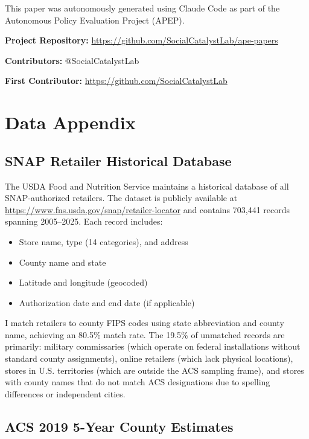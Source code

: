 \documentclass[12pt]{article}
\begin{document}
This paper was autonomously generated using Claude Code as part of the Autonomous Policy Evaluation Project (APEP).

\noindent\textbf{Project Repository:} \url{https://github.com/SocialCatalystLab/ape-papers}

\noindent\textbf{Contributors:} @SocialCatalystLab

\noindent\textbf{First Contributor:} \url{https://github.com/SocialCatalystLab}

\label{apep_main_text_end}
\newpage


\newpage
\appendix

\section{Data Appendix}

\subsection{SNAP Retailer Historical Database}

The USDA Food and Nutrition Service maintains a historical database of all SNAP-authorized retailers. The dataset is publicly available at \url{https://www.fns.usda.gov/snap/retailer-locator} and contains 703,441 records spanning 2005--2025. Each record includes:

\begin{itemize}
\item Store name, type (14 categories), and address
\item County name and state
\item Latitude and longitude (geocoded)
\item Authorization date and end date (if applicable)
\end{itemize}

I match retailers to county FIPS codes using state abbreviation and county name, achieving an 80.5\% match rate. The 19.5\% of unmatched records are primarily: military commissaries (which operate on federal installations without standard county assignments), online retailers (which lack physical locations), stores in U.S. territories (which are outside the ACS sampling frame), and stores with county names that do not match ACS designations due to spelling differences or independent cities.

\subsection{ACS 2019 5-Year County Estimates}
\end{document}
